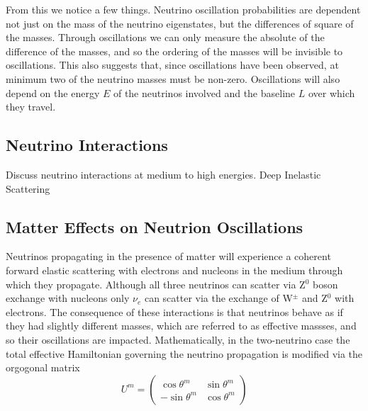 \documentclass[main.tex]{subfiles}
\begin{document}
From this we notice a few things. 
Neutrino oscillation probabilities are dependent not just on the mass of the neutrino eigenstates, but the differences of square of the masses. 
Through oscillations we can only measure the absolute of the difference of the masses, and so the ordering of the masses will be invisible to oscillations. 
This also suggests that, since oscillations have been observed, at minimum two of the neutrino masses must be non-zero. 
Oscillations will also depend on the energy $E$ of the neutrinos involved and the baseline $L$ over which they travel. 


\subsection{Neutrino Interactions}
Discuss neutrino interactions at medium to high energies. Deep Inelastic Scattering

\subsection{Matter Effects on Neutrion Oscillations}
Neutrinos propagating in the presence of matter will experience a coherent forward elastic scattering with electrons and nucleons in the medium through which they propagate. Although all three neutrinos can scatter via Z$^{0}$ boson exchange with nucleons only $\nu_{e}$ can scatter via the exchange of W$^{\pm}$ and Z$^{0}$ with electrons. 
The consequence of these interactions is that neutrinos behave as if they had slightly different masses, which are referred to as effective massses, and so their oscillations are impacted.  
Mathematically, in the two-neutrino case the total effective Hamiltonian governing the neutrino propagation is modified via the orgogonal matrix 
\begin{equation}
    U^{m} = \left( \begin{array}{cc} \cos\theta^{m} & \sin\theta^{m} \\ -\sin\theta^{m} & \cos\theta^{m} \end{array}\right) 
\end{equation}
\end{document}
